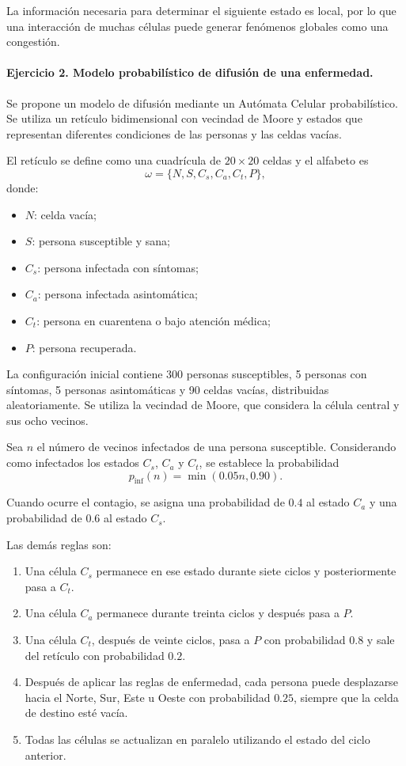 \documentclass[14pt,twoside]{article}
\begin{document}
La información necesaria para determinar el siguiente estado es local, por lo que una
interacción de muchas células puede generar fenómenos globales como una congestión.

\paragraph{Ejercicio 2. Modelo probabilístico de difusión de una enfermedad.}

Se propone un modelo de difusión mediante un Autómata Celular probabilístico. Se utiliza
un retículo bidimensional con vecindad de Moore y estados que representan diferentes
condiciones de las personas y las celdas vacías.

El retículo se define como una cuadrícula de $20\times20$ celdas y el alfabeto es
\[
\omega=\{N,S,C_s,C_a,C_t,P\},
\]
donde:

\begin{itemize}
    \item $N$: celda vacía;
    \item $S$: persona susceptible y sana;
    \item $C_s$: persona infectada con síntomas;
    \item $C_a$: persona infectada asintomática;
    \item $C_t$: persona en cuarentena o bajo atención médica;
    \item $P$: persona recuperada.
\end{itemize}

La configuración inicial contiene 300 personas susceptibles, 5 personas con síntomas,
5 personas asintomáticas y 90 celdas vacías, distribuidas aleatoriamente. Se utiliza la
vecindad de Moore, que considera la célula central y sus ocho vecinos.

Sea $n$ el número de vecinos infectados de una persona susceptible. Considerando como
infectados los estados $C_s$, $C_a$ y $C_t$, se establece la probabilidad
\[
p_{\mathrm{inf}}(n)=\min(0.05n,0.90).
\]

Cuando ocurre el contagio, se asigna una probabilidad de $0.4$ al estado $C_a$ y una
probabilidad de $0.6$ al estado $C_s$.

Las demás reglas son:

\begin{enumerate}[label=\arabic*.]
    \item Una célula $C_s$ permanece en ese estado durante siete ciclos y posteriormente
    pasa a $C_t$.
    \item Una célula $C_a$ permanece durante treinta ciclos y después pasa a $P$.
    \item Una célula $C_t$, después de veinte ciclos, pasa a $P$ con probabilidad $0.8$
    y sale del retículo con probabilidad $0.2$.
    \item Después de aplicar las reglas de enfermedad, cada persona puede desplazarse
    hacia el Norte, Sur, Este u Oeste con probabilidad $0.25$, siempre que la celda de
destino esté vacía.
    \item Todas las células se actualizan en paralelo utilizando el estado del ciclo
    anterior.
\end{enumerate}
\end{document}
